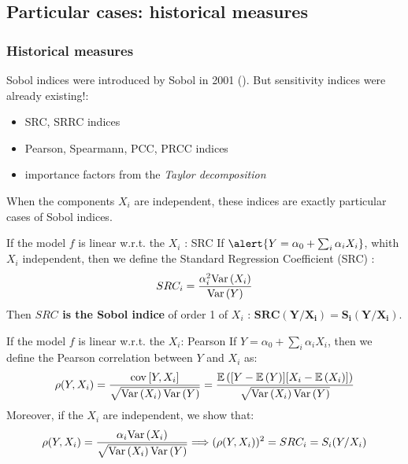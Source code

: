 \documentclass[8pt]{beamer}
\begin{document}
\subsection{Particular cases: historical measures}

\begin{frame}
\frametitle{Historical measures}
 \small
 
 Sobol indices  were introduced by Sobol in 2001 (\cite{Sobol2001}). But sensitivity indices were already existing!:
 \begin{itemize}
  \item SRC, SRRC indices
  \item Pearson, Spearmann, PCC, PRCC indices
  \item importance factors from the \emph{Taylor decomposition}
 \end{itemize}
\alert{When the components $X_i$ are independent, these indices are exactly particular cases of Sobol indices.}

 \begin{block}{If the model $f$ is linear  w.r.t. the  $X_i$ : SRC}
  If $\alert{Y = \alpha_0 + \sum_i \alpha_i X_i}$, whith \alert{ $X_i$ independent}, then we define the  \alert{ Standard Regression Coefficient (SRC)} :
    \begin{equation}
      SRC_i = \displaystyle \frac{\alpha_i^2 \mbox{Var}\left( X_i \right)}{\mbox{Var}\left( Y \right)}
    \end{equation}
    Then {\bf $SRC $ is the Sobol indice} of order 1 of $X_i$ : $\boldsymbol{    SRC (Y / X_i) = S_i(Y / X_i)}$.
 \end{block}

 
\begin{block}{If the model $f$ is linear  w.r.t. the  $X_i$: Pearson}
 If  \alert{$Y=\alpha_0 + \sum_i \alpha_i X_i$}, then we define the \alert{ Pearson correlation} between $Y$ and $X_i$ as:
   \begin{equation}
    \rho(Y,X_i) =  \dfrac{{\rm cov}\left[Y,X_i \right]}{\sqrt{\mbox{Var}\left( X_i \right)\mbox{Var}\left( Y \right)}} = \dfrac{\mathbb{E}\left( [Y-\mathbb{E}\left( Y \right)][X_i - \mathbb{E}\left( X_i \right)] \right)}{\sqrt{\mbox{Var}\left( X_i \right)\mbox{Var}\left( Y \right)}}
  \end{equation}
Moreover, if the  \alert{ $X_i$ are independent}, we show that:
  $$
  \rho(Y,X_i) = \dfrac{\alpha_i \mbox{Var}\left( X_i \right)}{\sqrt{\mbox{Var}\left( X_i \right)\mbox{Var}\left( Y \right)}} \Longrightarrow (\rho(Y,X_i))^2 = SRC_i = S_i(Y/X_i)
  $$
  \end{block}
\end{frame}
 
\end{document}
